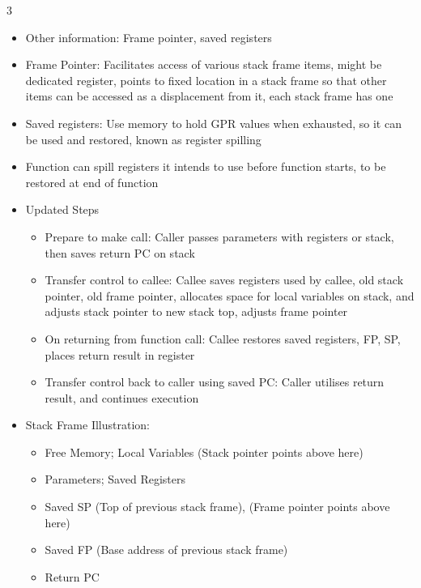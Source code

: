 \documentclass[10pt, landscape]{article}
\begin{document}
\begin{multicols*}{3}
\begin{itemize}
\begin{itemize}
        \item Transfer control back to caller using saved PC: Caller utilises return result, and continues execution
    \end{itemize}
    \item Other information: Frame pointer, saved registers
    \item Frame Pointer: Facilitates access of various stack frame items, might be dedicated register, points to fixed location in a stack frame so that other items can be accessed as a displacement from it, each stack frame has one
    \item Saved registers: Use memory to hold GPR values when exhausted, so it can be used and restored, known as register spilling
    \item Function can spill registers it intends to use before function starts, to be restored at end of function
    \item Updated Steps
    \begin{itemize}
        \item Prepare to make call: Caller passes parameters with registers or stack, then saves return PC on stack
        \item Transfer control to callee: Callee saves registers used by callee, old stack pointer, old frame pointer, allocates space for local variables on stack, and adjusts stack pointer to new stack top, adjusts frame pointer
        \item On returning from function call: Callee restores saved registers, FP, SP, places return result in register
        \item Transfer control back to caller using saved PC: Caller utilises return result, and continues execution
    \end{itemize}
    \item Stack Frame Illustration:
    \begin{itemize}
        \item Free Memory; Local Variables (Stack pointer points above here)
        \item Parameters; Saved Registers
        \item Saved SP (Top of previous stack frame), (Frame pointer points above here)
        \item Saved FP (Base address of previous stack frame)
        \item Return PC
    \end{itemize}
\end{itemize}


\end{multicols*}
\end{document}
